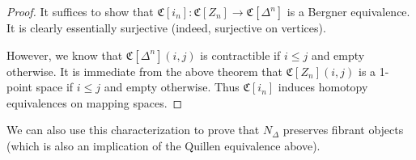 \begin{proof}
	It suffices to show that $\mathfrak{C}[i_n]:\mathfrak{C}[Z_n]\to \mathfrak{C}[\Delta^n]$ is a Bergner equivalence. It is clearly essentially surjective (indeed, surjective on vertices). 
	
	However, we know that $\mathfrak{C}[\Delta^n](i,j)$ is contractible if $i\leq j$ and empty otherwise. It is immediate from the above theorem that $\mathfrak{C}[Z_n](i,j)$ is a 1-point space if $i\leq j$ and empty otherwise. Thus $\mathfrak{C}[i_n]$ induces homotopy equivalences on mapping spaces.
\end{proof}

We can also use this characterization to prove that $N_{\Delta}$ preserves fibrant objects (which is also an implication of the Quillen equivalence above).

